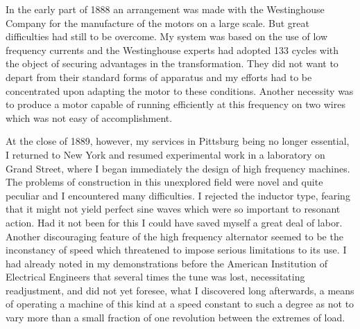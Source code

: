 \documentclass[a4paper,12pt,english,twoside,openright]{memoir}
\begin{document}
In the early part of 1888 an arrangement was made with the Westinghouse Company for the 
manufacture of the motors on a large scale.  But great difficulties had still to be overcome.  My 
system was based on the use of low frequency currents and the Westinghouse experts had 
adopted 133 cycles with the object of securing advantages in the transformation.  They did not 
want to depart from their standard forms of apparatus and my efforts had to be concentrated 
upon adapting the motor to these conditions.  Another necessity was to produce a motor capable 
of running efficiently at this frequency on two wires which was not easy of accomplishment.  



At the close of 1889, however, my services in Pittsburg being no longer essential, I returned to 
New York and resumed experimental work in a laboratory on Grand Street, where I began 
immediately the design of high frequency machines.  The problems of construction in this 
unexplored field were novel and quite peculiar and I encountered many difficulties.  I rejected the 
inductor type, fearing that it might not yield perfect sine waves which were so important to 
resonant action.  Had it not been for this I could have saved myself a great deal of labor.  Another 
discouraging feature of the high frequency alternator seemed to be the inconstancy of speed 
which threatened to impose serious limitations to its use.  I had already noted in my 
demonstrations before the American Institution of Electrical Engineers that several times the tune 
was lost, necessitating readjustment, and did not yet foresee, what I discovered long afterwards, 
a means of operating a machine of this kind at a speed constant to such a degree as not to vary 
more than a small fraction of one revolution between the extremes of load.  
\end{document}
